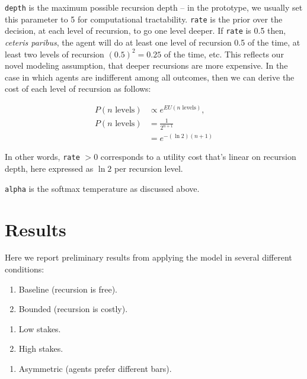 \texttt{depth} is the maximum possible recursion depth -- in the
prototype, we usually set this parameter to 5 for computational
tractability. \texttt{rate} is the prior over the decision, at each
level of recursion, to go one level deeper. If \texttt{rate} is 0.5
then, \emph{ceteris paribus}, the agent will do at least one level of
recursion 0.5 of the time, at least two levels of recursion
\((0.5)^2 = 0.25\) of the time, etc. This reflects our novel modeling
assumption, that deeper recursions are more expensive. In the case in
which agents are indifferent among all outcomes, then we can derive the
cost of each level of recursion as follows:

\begin{align*} 
P(n\text{ levels}) &\propto e^{EU(n\text{ levels})},\\
P(n\text{ levels}) &= \frac{1}{2^{n+1}} \\
                   &= e^{-(\ln 2)(n+1)}
\end{align*}

In other words, \texttt{rate} \(> 0\) corresponds to a utility cost
that's linear on recursion depth, here expressed as \(\ln 2\) per
recursion level.

\texttt{alpha} is the softmax temperature as discussed above.

\section{Results}\label{results}

Here we report preliminary results from applying the model in several
different conditions:

\begin{enumerate}
\def\labelenumi{\arabic{enumi}.}
\itemsep1pt\parskip0pt
\item
  Baseline (recursion is free).
\item
  Bounded (recursion is costly).
\end{enumerate}

\begin{enumerate}
\def\labelenumi{\alph{enumi}.}
\itemsep1pt\parskip0pt
\item
  Low stakes.
\item
  High stakes.
\end{enumerate}

\begin{enumerate}
\def\labelenumi{\arabic{enumi}.}
\setcounter{enumi}{2}
\itemsep1pt\parskip0pt
\item
  Asymmetric (agents prefer different bars).
\end{enumerate}

